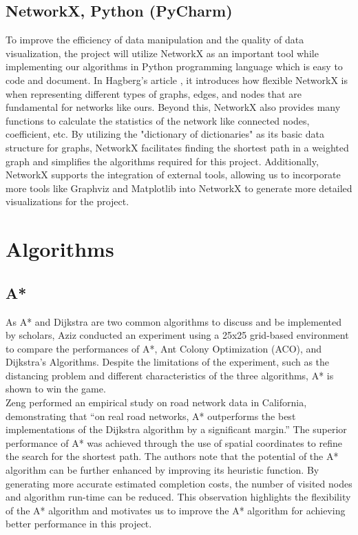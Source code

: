 \documentclass[12pt]{article}
\begin{document}
\subsection{NetworkX, Python (PyCharm)}
To improve the efficiency of data manipulation and the quality of data visualization, the project will utilize NetworkX as an important tool while implementing our algorithms in Python programming language which is easy to code and document. In Hagberg's article \cite{Hagberg_Aric_Pieter_Daniel_2008}, it introduces how flexible NetworkX is when representing different types of graphs, edges, and nodes that are fundamental for networks like ours. Beyond this, NetworkX also provides many functions to calculate the statistics of the network like connected nodes, coefficient, etc. By utilizing the "dictionary of dictionaries" as its basic data structure for graphs, NetworkX facilitates finding the shortest path in a weighted graph and simplifies the algorithms required for this project. Additionally, NetworkX supports the integration of external tools, allowing us to incorporate more tools like Graphviz and Matplotlib into NetworkX to generate more detailed visualizations for the project. 


\section{Algorithms}
\subsection{A*}
As A* and Dijkstra are two common algorithms to discuss and be implemented by scholars, Aziz \cite{Aziz_Anusha_Sheikh_2022} conducted an experiment using a 25x25 grid-based environment to compare the performances of A*, Ant Colony Optimization (ACO), and Dijkstra's Algorithms. Despite the limitations of the experiment, such as the distancing problem and different characteristics of the three algorithms, A* is shown to win the game. \\
Zeng \cite{Zeng_Church_2009} performed an empirical study on road network data in California, demonstrating that “on real road networks, A* outperforms the best implementations of the Dijkstra algorithm by a significant margin.” The superior performance of A* was achieved through the use of spatial coordinates to refine the search for the shortest path. The authors note that the potential of the A* algorithm can be further enhanced by improving its heuristic function. By generating more accurate estimated completion costs, the number of visited nodes and algorithm run-time can be reduced. This observation highlights the flexibility of the A* algorithm and motivates us to improve the A* algorithm for achieving better performance in this project.
\end{document}
